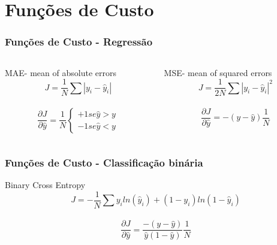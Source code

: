 \documentclass{beamer}
\begin{document}
\section{Funções de Custo}

\begin{frame}
	\frametitle{Funções de Custo - Regressão}
		\begin{columns}
		\begin{column}{0.4\textwidth}
			\begin{block}{MAE- mean of absolute errors}
				$$J = \frac{1}{N} \sum |y_i - \hat{y}_i|$$ \\
				$$\frac{\partial J}{\partial \hat{y}} = \frac{1}{N} \left\{\begin{matrix}
					+1 se \hat{y} > y
					\\ 
					-1 se \hat{y} < y
				\end{matrix}\right.$$ 
			\end{block}
		\end{column}
		\begin{column}{0.4\textwidth}
			\begin{block}{MSE- mean of squared errors}
				$$J = \frac{1}{2N} \sum |y_i - \hat{y}_i|^2$$ \\
				$$\frac{\partial J}{\partial \hat{y}} = -(y-\hat{y})\frac{1}{N}$$ 
			\end{block}
		\end{column}
	\end{columns}
\end{frame}

\begin{frame}
	\frametitle{Funções de Custo - Classificação binária}
	\begin{block}{Binary Cross Entropy}
		$$J = -\frac{1}{N} \sum y_iln(\hat{y}_i)+(1-y_i)ln(1-\hat{y}_i)$$ \\
		$$\frac{\partial J}{\partial \hat{y}} = \frac{-(y-\hat{y})}{\hat{y}(1-\hat{y})}\frac{1}{N}$$ 
	\end{block}
\end{frame}

\end{document}
